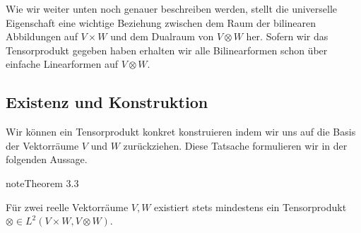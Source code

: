 \documentclass[letterpaper,10pt,english]{jupyterBook}
\begin{document}
\sphinxAtStartPar
{}

\sphinxAtStartPar
Wie wir weiter unten noch genauer beschreiben werden, stellt die universelle Eigenschaft eine wichtige Beziehung zwischen dem Raum der bilinearen Abbildungen auf \(V\times W\) und dem Dualraum von \(V\otimes W\) her. Sofern wir das Tensorprodukt gegeben haben erhalten wir alle Bilinearformen schon über einfache Linearformen auf \(V\otimes W\).


\subsection{Existenz und Konstruktion}
\label{\detokenize{vektoranalysis/tensor:existenz-und-konstruktion}}
\sphinxAtStartPar
Wir können ein Tensorprodukt konkret konstruieren indem wir uns auf die Basis der Vektorräume \(V\) und \(W\) zurückziehen. Diese Tatsache formulieren wir in der folgenden Aussage.
\label{vektoranalysis/tensor:theorem-2}
\begin{sphinxadmonition}{note}{Theorem 3.3}



\sphinxAtStartPar
Für zwei reelle Vektorräume \(V, W\) existiert stets mindestens ein Tensorprodukt \(\otimes\in L^2(V\times W, V\otimes W)\).
\end{sphinxadmonition}
\end{document}
